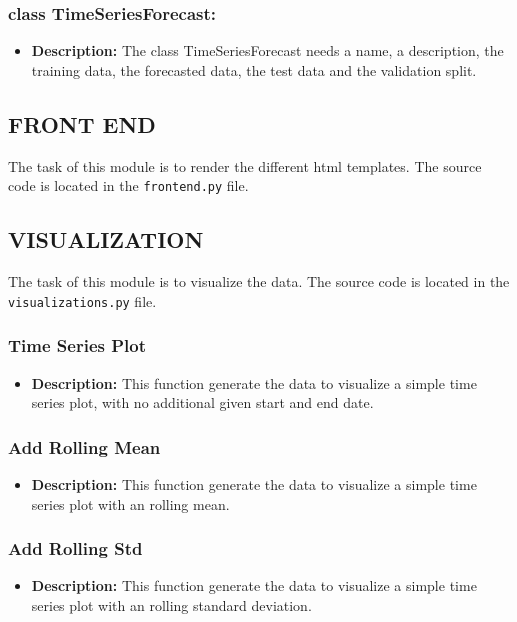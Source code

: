 \documentclass[11pt, a4paper]{article}
\begin{document}
\subsubsection*{class TimeSeriesForecast:}
\begin{itemize}
 \item[] \textbf{Description:} The class TimeSeriesForecast needs a name, a description, the training data, the forecasted data, the test data and the validation split.
\end{itemize}

\subsection{FRONT END}
The task of this module is to render the different html templates.
The source code is located in the \texttt{frontend.py} file.

\subsection{VISUALIZATION}
The task of this module is to visualize the data.
The source code is located in the \texttt{visualizations.py} file.

\subsubsection*{Time Series Plot}
\begin{itemize}
 \item[] \textbf{Description:} This function generate the data to visualize a simple time series plot, with no additional given start and end date.
\end{itemize}

\subsubsection*{Add Rolling Mean}
\begin{itemize}
 \item[] \textbf{Description:} This function generate the data to visualize a simple time series plot with an rolling mean.
\end{itemize}

\subsubsection*{Add Rolling Std}
\begin{itemize}
 \item[] \textbf{Description:} This function generate the data to visualize a simple time series plot with an rolling standard deviation.
\end{itemize}
\end{document}
